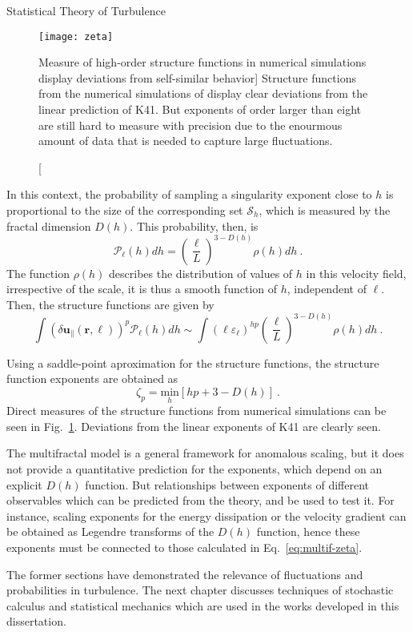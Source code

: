 \begin{chapter}{Statistical Theory of Turbulence}
\begin{figure}[h]
    \centering
    \texttt{[image: zeta]}
    \caption
    [Measure of high-order structure functions in numerical
    simulations display deviations from self-similar behavior]
    {Structure functions from the numerical
    simulations of \textcite{benzi2010inertial} display clear deviations from
    the linear prediction of K41. But exponents of order larger
    than eight are still hard to measure with precision due
    to the enourmous amount of data that is needed to capture large fluctuations.
    }
    \label{fig:zeta}
\end{figure}


In this context, the probability of sampling a singularity
exponent close to $h$ is proportional to the size of the corresponding
set $\mathcal{S}_h$, which is
measured by the fractal dimension $D(h)$.
This probability, then, is
\begin{equation}
    \mathcal{P}_{\ell}(h) dh = \left(\frac{\ell}{L}\right)^{3-D(h)} \rho(h) dh \ .
\end{equation}
The function $\rho(h)$ describes the distribution of values
of $h$ in this velocity field, irrespective of the scale,
it is thus a smooth function of $h$, independent of $\ell$.
Then, the structure functions are given by
\begin{equation} \label{eq:multif-veldif}
    \int \left(\delta \mathbf{u}_{ \|}(\bm{r}, \ell)\right)^{p} \mathcal{P}_{\ell}(h) dh
    \sim \int \left(\ell \varepsilon_{\ell}\right)^{h p}
    \left(\frac{\ell}{L}\right)^{3-D(h)} \rho(h) dh \ .
\end{equation}

Using a saddle-point aproximation for the structure functions,
the structure function exponents are obtained as
\begin{equation} \label{eq:multif-zeta}
    \zeta_p = \underset{h}{\mbox{min}} [ h p + 3 - D(h) ] \ .
\end{equation}
Direct measures of the structure functions
from numerical simulations can be seen in Fig.~\ref{fig:zeta}.
Deviations from the linear exponents of K41 are
clearly seen.

The multifractal model is a general framework for
anomalous scaling, but it does not provide a
quantitative prediction for the exponents,
which depend on an explicit $D(h)$ function.
But relationships between exponents of different observables
which can be predicted from the theory,
and be used to test it. For instance, scaling exponents for
the energy dissipation \parencite{mandelbrot1974intermittent}
or the velocity gradient \parencite{nelkin1990multifractal} can be obtained
as Legendre transforms of the $D(h)$ function,
hence these exponents must be connected to those calculated in
Eq.~\eqref{eq:multif-zeta}.

The former sections have demonstrated the relevance of fluctuations
and probabilities in turbulence.  The next chapter discusses
techniques of stochastic calculus and statistical mechanics which
are used in the works developed in this dissertation.


\end{chapter}
